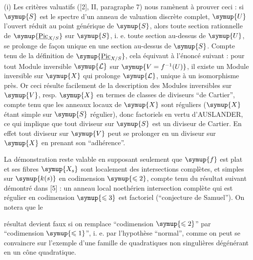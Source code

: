 (i) Les critères valuatifs ([2], II, paragraphe 7) nous ramènent à prouver ceci :
si $\symup{S}$ est le spectre d'un anneau de valuation discrète complet, $\symup{U}$ l'ouvert
réduit au point générique de $\symup{S}$, alors toute section rationnelle de
$\symup{\underline{\operatorname{Pic}}_{X/S}}$ sur $\symup{S}$, i. e. toute section au-dessus de $\symup{U}$, se
prolonge de façon unique en une section au-dessus de $\symup{S}$. Compte tenu de la
définition de $\symup{\underline{\operatorname{Pic}}_{X/S}}$, cela équivaut à l'énoncé suivant :
pour tout Module inversible $\symup{\mathcal L}$ sur $\symup{V=f^{-1}(U)}$, il existe un Module
inversible sur $\symup{X}$ qui prolonge $\symup{\mathcal L}$, unique à un isomorphisme près. Or
ceci résulte facilement de la description des Modules inversibles sur $\symup{V}$,
resp. $\symup{X}$ en termes de classes de diviseurs ``de Cartier'', compte tenu que
les anneaux locaux de $\symup{X}$ sont réguliers ($\symup{X}$ étant simple sur $\symup{S}$ régulier),
donc factoriels en vertu d'AUSLANDER, ce qui implique que tout diviseur sur
$\symup{S}$ est un diviseur de Cartier. En effet tout diviseur sur $\symup{V}$ peut se prolonger en un diviseur sur $\symup{X}$ en prenant son
``adhérence''.


 La démonstration reste valable en supposant seulement
que $\symup{f}$ est plat et ses fibres $\symup{X_s}$ sont localement des intersections
complètes, et simples sur $\symup{k(s)}$ en codimension $\symup{\leqslant2}$, compte tenu du résultat
suivant démontré dans [5] : un anneau local noethérien intersection complète
qui est régulier en codimension $\symup{\leqslant3}$ est factoriel (``conjecture de Samuel'').
On notera que le

résultat devient faux si on remplace ``codimension $\symup{\leqslant2}$'' par ``codimension $\symup{\leqslant1}$'', i. e. par l'hypothèse ``normal'', comme on peut se convaincre sur
l'exemple d'une famille de quadratiques non singulières dégénérant en un cône
quadratique.


